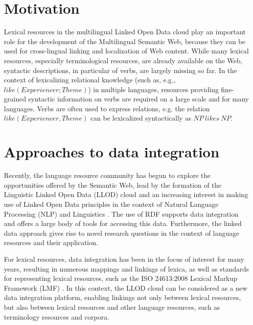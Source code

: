 \section{Motivation}

Lexical resources in the multilingual Linked Open Data cloud play an
important role for the development of the Multilingual Semantic Web,
because they can be used for cross-lingual linking and localization of Web
content. While many lexical resources, especially terminological resources, are
already available on the Web, syntactic descriptions, in particular of verbs, are largely
missing so far.
In the context of lexicalizing relational knowledge (such as, e.g.,
$like(Experiencer;Theme)$) in multiple languages, resources providing
fine-grained syntactic information on verbs are required on a large scale
and for many languages. Verbs are often used to express relations, e.g.
the relation $like(Experiencer, Theme)$ can be lexicalized syntactically as $NP~likes~NP$.

\section{Approaches to data integration}
Recently, the language resource community has begun to explore the opportunities offered by the Semantic
Web, lead by the formation of the Linguistic Linked Open Data (LLOD) cloud
and an increasing interest in making use of Linked Open Data principles in the context
of Natural Language Processing (NLP) and Linguistics  \cite{chiarcos2012linked}. 
The use of RDF supports data integration and offers a large body of tools for accessing this data.
Furthermore, the linked data approach gives rise to novel research questions in the context of
language resources and their application.


 For lexical resources, data integration has been in
 the focus of interest for many years, resulting in numerous mappings and linkings of lexica, as well as 
standards for representing lexical resources, such as the ISO 24613:2008 Lexical Markup Framework
(LMF) \cite{francopoulo2006lexical}. In this context, the LLOD cloud can be considered as a new data integration platform, enabling linkings not only between lexical resources, but also between lexical resources and
other language resources, such as terminology resources and corpora.


